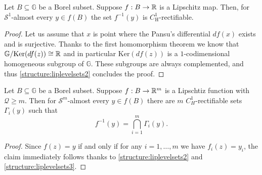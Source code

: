 \documentclass[10pt, a4paper,
oneside, headinclude,footinclude]{scrartcl}
\begin{document}
\begin{corollario}\label{structure:liplevelsets3}
Let $B\subseteq \mathbb G$ be a Borel subset. Suppose $f:B\to \mathbb{R}$ is a Lipschitz map. Then, for $\mathcal{S}^1$-almost every $y\in f(B)$ the set $f^{-1}(y)$ is $C^1_{\mathrm{H}}$-rectifiable.
\end{corollario}

\begin{proof}
Let us assume that $x$ is point where the Pansu's differential $df(x)$ exists and is surjective. Thanks to the first homomorphism theorem we know that $\mathbb{G}/\mathrm{Ker}(df(z))\cong \mathbb{R}$ and in particular $\mathrm{Ker}(df(z))$ is a $1$-codimensional homogeneous subgroup of $\mathbb{G}$. These subgroups are always complemented, and thus \cref{structure:liplevelsets2} concludes the proof.
\end{proof}


\begin{corollario}\label{structurelip4}
Let $B\subseteq \mathbb G$ be a Borel subset. Suppose $f:B\to\mathbb{R}^m$ is a Lipschtiz function with $\mathcal{Q}\geq m$. Then for $\mathcal{S}^m$-almost every $y\in f(B)$ there are $m$ $C^1_H$-rectifiable sets $\Gamma_i(y)$ such that
$$f^{-1}(y)=\bigcap_{i=1}^m \Gamma_i(y).$$
\end{corollario}

\begin{proof}
Since $f(z)=y$ if and only if for any $i=1,\ldots,m$ we have $f_i(z)=y_i$, the claim immediately follows thanks to \cref{structure:liplevelsets2} and \cref{structure:liplevelsets3}.
\end{proof}






\end{document}
